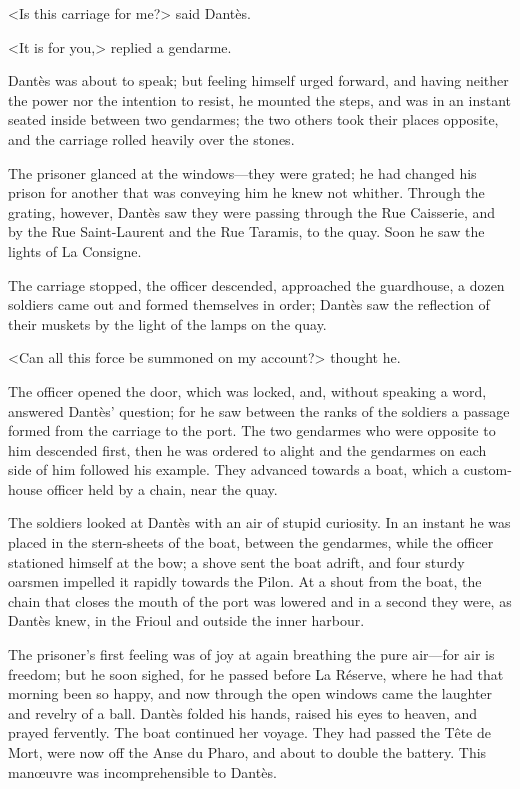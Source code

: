  <Is this carriage for me?> said Dantès. 

 <It is for you,> replied a gendarme. 

 Dantès was about to speak; but feeling himself urged forward, and having neither the power nor the intention to resist, he mounted the steps, and was in an instant seated inside between two gendarmes; the two others took their places opposite, and the carriage rolled heavily over the stones. 

 The prisoner glanced at the windows—they were grated; he had changed his prison for another that was conveying him he knew not whither. Through the grating, however, Dantès saw they were passing through the Rue Caisserie, and by the Rue Saint-Laurent and the Rue Taramis, to the quay. Soon he saw the lights of La Consigne. 

 The carriage stopped, the officer descended, approached the guardhouse, a dozen soldiers came out and formed themselves in order; Dantès saw the reflection of their muskets by the light of the lamps on the quay. 

 <Can all this force be summoned on my account?> thought he. 

 The officer opened the door, which was locked, and, without speaking a word, answered Dantès' question; for he saw between the ranks of the soldiers a passage formed from the carriage to the port. The two gendarmes who were opposite to him descended first, then he was ordered to alight and the gendarmes on each side of him followed his example. They advanced towards a boat, which a custom-house officer held by a chain, near the quay. 

 The soldiers looked at Dantès with an air of stupid curiosity. In an instant he was placed in the stern-sheets of the boat, between the gendarmes, while the officer stationed himself at the bow; a shove sent the boat adrift, and four sturdy oarsmen impelled it rapidly towards the Pilon. At a shout from the boat, the chain that closes the mouth of the port was lowered and in a second they were, as Dantès knew, in the Frioul and outside the inner harbour. 

 The prisoner's first feeling was of joy at again breathing the pure air—for air is freedom; but he soon sighed, for he passed before La Réserve, where he had that morning been so happy, and now through the open windows came the laughter and revelry of a ball. Dantès folded his hands, raised his eyes to heaven, and prayed fervently.  The boat continued her voyage. They had passed the Tête de Mort, were now off the Anse du Pharo, and about to double the battery. This manœuvre was incomprehensible to Dantès. 

